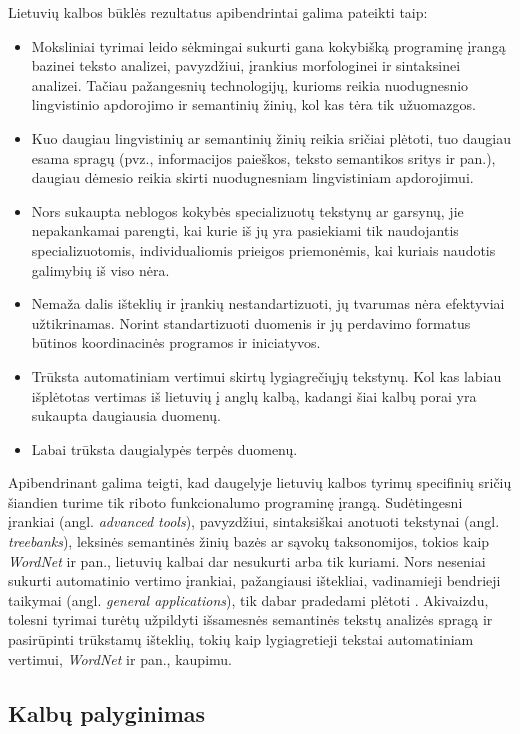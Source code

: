 \begin{multicols}{2}
Lietuvių kalbos būklės rezultatus apibendrintai galima pateikti taip:

\begin{itemize}
\item Moksliniai tyrimai leido sėkmingai sukurti gana kokybišką programinę įrangą bazinei teksto analizei, pavyzdžiui, įrankius morfologinei ir sintaksinei analizei. Tačiau pažangesnių technologijų, kurioms reikia nuodugnesnio lingvistinio apdorojimo ir semantinių žinių, kol kas tėra tik užuomazgos.
\item Kuo daugiau lingvistinių ar semantinių žinių reikia sričiai plėtoti, tuo daugiau esama spragų (pvz., informacijos paieškos, teksto semantikos sritys ir pan.), daugiau dėmesio reikia skirti nuodugnesniam lingvistiniam apdorojimui.
\item Nors sukaupta neblogos kokybės specializuotų tekstynų ar garsynų, jie nepakankamai parengti, kai kurie iš jų yra pasiekiami tik naudojantis specializuotomis, individualiomis prieigos priemonėmis, kai kuriais naudotis galimybių iš viso nėra. 
\item  Nemaža dalis išteklių ir įrankių nestandartizuoti, jų tvarumas nėra efektyviai užtikrinamas. Norint standartizuoti duomenis ir jų perdavimo formatus būtinos koordinacinės programos ir iniciatyvos.
\item Trūksta automatiniam vertimui skirtų lygiagrečiųjų tekstynų. Kol kas labiau išplėtotas vertimas iš lietuvių į anglų kalbą, kadangi šiai kalbų porai yra sukaupta daugiausia duomenų.
\item Labai trūksta daugialypės terpės duomenų.	
\end{itemize}

Apibendrinant galima teigti, kad daugelyje lietuvių kalbos tyrimų specifinių sričių šiandien turime tik riboto funkcionalumo programinę įrangą. Sudėtingesni įrankiai (angl. \textit{advanced tools}), pavyzdžiui, sintaksiškai anotuoti tekstynai (angl. \textit{treebanks}), leksinės semantinės žinių bazės ar sąvokų taksonomijos, tokios kaip \textit{WordNet} ir pan., lietuvių kalbai dar nesukurti arba tik kuriami. Nors neseniai sukurti automatinio vertimo įrankiai, pažangiausi ištekliai, vadinamieji bendrieji taikymai (angl. \textit{general applications}), tik dabar pradedami plėtoti \cite{td1}. Akivaizdu, tolesni tyrimai turėtų užpildyti išsamesnės semantinės tekstų analizės spragą ir pasirūpinti trūkstamų išteklių, tokių kaip lygiagretieji tekstai automatiniam vertimui, \textit{WordNet} ir pan., kaupimu.

\subsection{Kalbų palyginimas}


\end{multicols}
